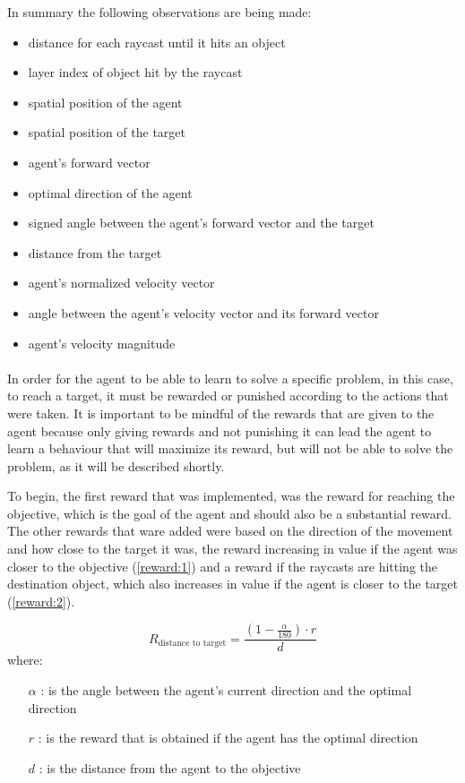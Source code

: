 In summary the following observations are being made:
\begin{itemize}
    \item distance for each raycast until it hits an object
    \item layer index of object hit by the raycast
    \item spatial position of the agent
    \item spatial position of the target
    \item agent's forward vector
    \item optimal direction of the agent
    \item signed angle between the agent's forward vector and the target
    \item distance from the target
    \item agent's normalized velocity vector
    \item angle between the agent's velocity vector and its forward vector
    \item agent's velocity magnitude
\end{itemize}

\paragraph{}
In order for the agent to be able to learn to solve a specific problem, in this case, to reach a target, it must be rewarded or punished according to the actions that were taken. It is important to be mindful of the rewards that are given to the agent because only giving rewards and not punishing it can lead the agent to learn a behaviour that will maximize its reward, but will not be able to solve the problem, as it will be described shortly.

To begin, the first reward that was implemented, was the reward for reaching the objective, which is the goal of the agent and should also be a substantial reward. The other rewards that ware added were based on the direction of the movement and how close to the target it was, the reward increasing in value if the agent was closer to the objective (\ref{reward:1}) and a reward if the raycasts are hitting the destination object, which also increases in value if the agent is closer to the target (\ref{reward:2}). 

\begin{equation} \label{reward:1}
    R_\text{distance to target} = \frac{(1 - \frac{\alpha}{180}) \cdot r}{d}
\end{equation}
where:
\begin{itemize}
    \item [$\alpha$]: is the angle between the agent's current direction and the optimal direction
    \item [$r$]: is the reward that is obtained if the agent has the optimal direction
    \item [$d$]: is the distance from the agent to the objective
\end{itemize}

